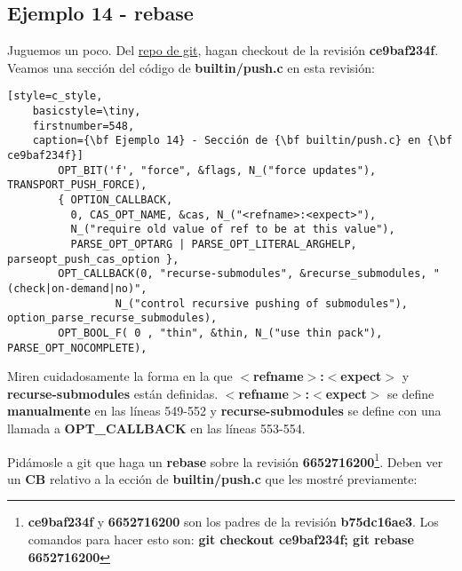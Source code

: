 \subsection{Ejemplo 14 - rebase}
\label{example_14}

Juguemos un poco. Del \hyperref[git_repo]{repo de git}, hagan checkout de la revisión {\bf ce9baf234f}. Veamos una sección
del código de {\bf builtin/push.c} en esta revisión:

\begin{lstlisting}[style=c_style,
	basicstyle=\tiny,
	firstnumber=548,
	caption={\bf Ejemplo 14} - Sección de {\bf builtin/push.c} en {\bf ce9baf234f}]
		OPT_BIT('f', "force", &flags, N_("force updates"), TRANSPORT_PUSH_FORCE),
		{ OPTION_CALLBACK,
		  0, CAS_OPT_NAME, &cas, N_("<refname>:<expect>"),
		  N_("require old value of ref to be at this value"),
		  PARSE_OPT_OPTARG | PARSE_OPT_LITERAL_ARGHELP, parseopt_push_cas_option },
		OPT_CALLBACK(0, "recurse-submodules", &recurse_submodules, "(check|on-demand|no)",
			     N_("control recursive pushing of submodules"), option_parse_recurse_submodules),
		OPT_BOOL_F( 0 , "thin", &thin, N_("use thin pack"), PARSE_OPT_NOCOMPLETE),
\end{lstlisting}

Miren cuidadosamente la forma en la que {\bf $<$refname$>$:$<$expect$>$} y {\bf recurse-submodules} están definidas.
{\bf $<$refname$>$:$<$expect$>$} se define {\bf manualmente} en las líneas 549-552 y {\bf recurse-submodules} se define
con una llamada a {\bf OPT\_CALLBACK} en las líneas 553-554.

Pidámosle a git que haga un {\bf rebase} sobre la revisión {\bf 6652716200}\footnote{{\bf ce9baf234f} y {\bf 6652716200}
son los padres de la revisión {\bf b75dc16ae3}. Los comandos para hacer esto son: {\bf git checkout ce9baf234f; git rebase 6652716200}}.
Deben ver un {\bf CB} relativo a la ección de {\bf builtin/push.c} que les mostré previamente:

